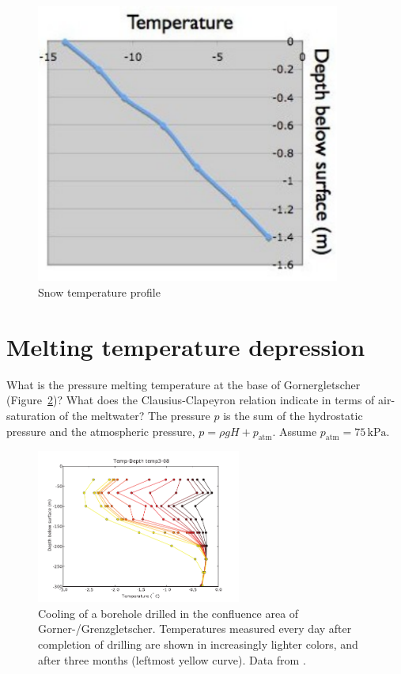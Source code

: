 \documentclass[parskip=half]{scrartcl}
\begin{document}
\begin{figure}
  \centering
  \includegraphics[width=10cm]{figures/cold-content} 
  \caption{Snow temperature profile}
  \label{fig:snow-temp-profile}
\end{figure}

\section{Melting temperature depression}

What is the pressure melting temperature at the base of Gornergletscher (Figure~\ref{fig:temp-profile-gorner})? What does the Clausius-Clapeyron relation indicate in terms of air-saturation of the meltwater? The pressure $p$ is the sum of the hydrostatic pressure and the atmospheric pressure, $p = \rho g H + p_{\mathrm{atm}}$. Assume $p_{\mathrm{atm}} = 75\,\mathrm{kPa}$.

\begin{figure}[tbhp]
 \centering
 \includegraphics[width=0.6\textwidth]{figures/gorner-temp-depth_temp3-08} 
 \caption{Cooling of a borehole drilled in the confluence area of
   Gorner-/Grenzgletscher. Temperatures  measured every day after
   completion of drilling are shown in increasingly lighter colors, and after three months
   (leftmost yellow curve). Data from \cite{Ryser2009}.
   \label{fig:temp-profile-gorner}}
\end{figure}
\end{document}
